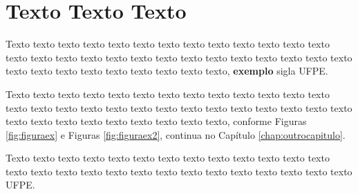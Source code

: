 \section{Texto Texto Texto}
\label{motivacao}

Texto texto texto texto texto texto texto texto texto texto texto texto texto texto texto texto texto texto texto texto texto texto texto texto texto texto texto texto texto texto texto texto texto texto texto texto, \textbf{exemplo} sigla \gls{UFPE}.



Texto texto texto texto texto texto texto texto texto texto texto texto texto texto texto texto texto texto texto texto texto texto texto texto texto texto texto texto texto texto texto texto texto texto texto texto, conforme Figuras \ref{fig:figuraex} e Figuras \ref{fig:figuraex2}, continua no Capítulo \ref{chap:outrocapitulo}.




Texto texto texto texto texto texto texto texto texto texto texto texto texto texto texto texto texto texto texto texto texto texto texto texto texto texto texto \gls{UFPE}.
